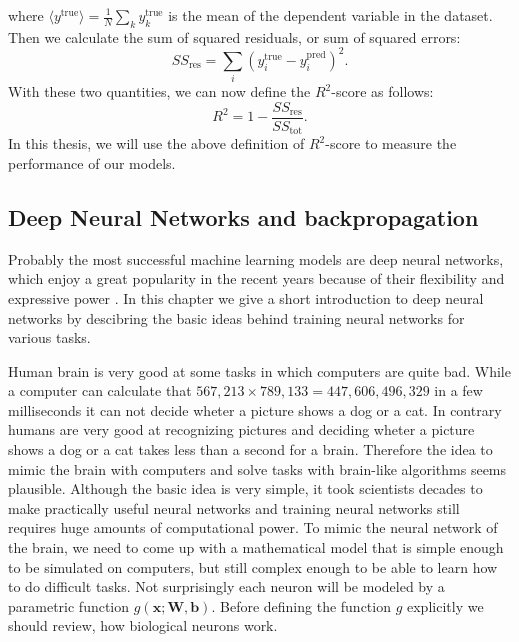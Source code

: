 \documentclass[12pt, a4paper,  nobibnotes]{article}
\begin{document}
where $\langle y^{\textrm{true}} \rangle =\frac{1}{N} \sum\limits_{k}y_k^{\textrm{true}}$ is the
mean of the dependent variable in the dataset. Then we calculate the sum of squared residuals,
or sum of squared errors:
\begin{equation}
    SS_{\textrm{res}} = \sum\limits_{i}(y^{\textrm{true}}_i-y^{\textrm{pred}}_i)^2.
\end{equation}
With these two quantities, we can now define the $R^2$-score as follows:
\begin{equation}
    R^2 = 1-\frac{SS_{\textrm{res}}}{SS_{\textrm{tot}}}.
\end{equation}
In this thesis, we will use the above definition of $R^2$-score to measure the performance of 
our models.

\subsection{Deep Neural Networks and backpropagation}
\label{sec:dnn}
Probably the most successful machine learning models are deep neural networks, which enjoy a great 
popularity in the recent years because of their flexibility and expressive power \cite{LeCun2015DeepLearning}.
In this chapter we give a short introduction to deep neural networks by descibring the basic 
ideas behind training neural networks for various tasks.

Human brain is very good at some tasks in which computers are quite bad. While a computer 
can calculate that $567,213\times 789,133 = 447,606,496,329$ in a few milliseconds it can not decide 
wheter a picture shows a dog or a cat. In contrary humans are very good at recognizing pictures and 
deciding wheter a picture shows a dog or a cat takes less than a second for a brain.
Therefore the idea to mimic the brain with computers and solve tasks with brain-like algorithms 
seems plausible. Although the basic idea is very simple, it took scientists decades to make 
practically useful neural networks and training neural networks still requires huge amounts
of computational power.
To mimic the neural network of the brain, we need to come up with a mathematical model that is 
simple enough to be simulated on computers, but still complex enough to be able to learn how 
to do difficult tasks. Not surprisingly each neuron will be modeled by
a parametric function $g(\mathbf x;\mathbf W, \mathbf b)$. Before defining the function 
$g$ explicitly we should review, how biological neurons work. 
\end{document}
